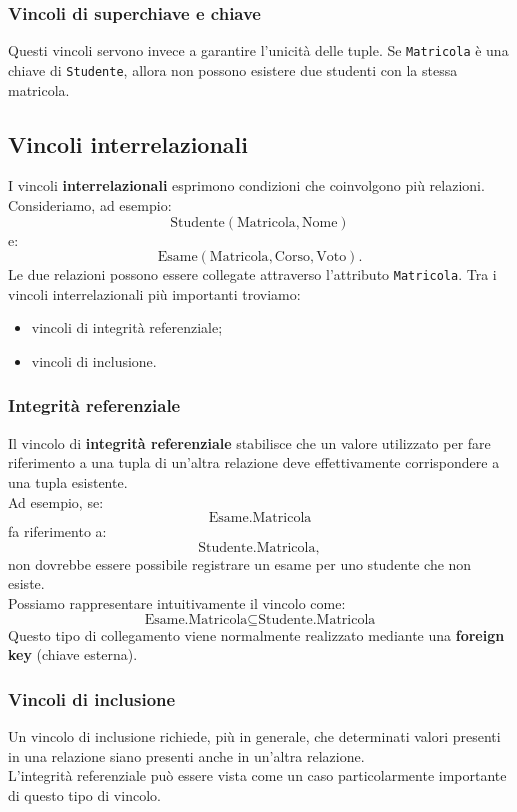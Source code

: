 \subsubsection{Vincoli di superchiave e chiave}
Questi vincoli servono invece a garantire l'unicità delle tuple.
Se \texttt{Matricola} è una chiave di \texttt{Studente}, allora
non possono esistere due studenti con la stessa matricola.

\subsection*{Vincoli interrelazionali}
I vincoli \textbf{interrelazionali} esprimono condizioni che coinvolgono
più relazioni.\\
Consideriamo, ad esempio:
\[
\text{Studente}(\text{Matricola},\text{Nome})
\]
e:
\[
\text{Esame}(\text{Matricola},\text{Corso},\text{Voto}).
\]
Le due relazioni possono essere collegate attraverso l'attributo
\texttt{Matricola}.
Tra i vincoli interrelazionali più importanti troviamo:
\begin{itemize}
    \item vincoli di integrità referenziale;
    \item vincoli di inclusione.
\end{itemize}
\subsubsection*{Integrità referenziale}
Il vincolo di \textbf{integrità referenziale} stabilisce che un valore
utilizzato per fare riferimento a una tupla di un'altra relazione
deve effettivamente corrispondere a una tupla esistente.\\
Ad esempio, se:
\[
\text{Esame.Matricola}
\]
fa riferimento a:
\[
\text{Studente.Matricola},
\]
non dovrebbe essere possibile registrare un esame per uno studente
che non esiste.\\
Possiamo rappresentare intuitivamente il vincolo come:
\[
\boxed{
\text{Esame.Matricola}
\subseteq
\text{Studente.Matricola}
}
\]
Questo tipo di collegamento viene normalmente realizzato mediante
una \textbf{foreign key} (chiave esterna).
\subsubsection{Vincoli di inclusione}
Un vincolo di inclusione richiede, più in generale, che determinati
valori presenti in una relazione siano presenti anche in un'altra
relazione.\\
L'integrità referenziale può essere vista come un caso particolarmente
importante di questo tipo di vincolo.

